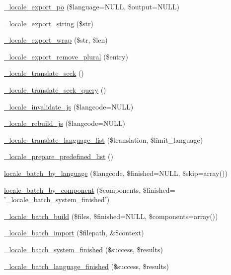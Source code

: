 \begin{DoxyCompactItemize}
\item 
\hyperlink{group__locale_gac152719d6aeadee6074247100424e145}{\_\-locale\_\-export\_\-po} (\$language=NULL, \$output=NULL)
\item 
\hyperlink{group__locale_ga8203c2c5a4f964da2395889920934fae}{\_\-locale\_\-export\_\-string} (\$str)
\item 
\hyperlink{group__locale_gaae41274b64222185a36a42dbc0ff4b94}{\_\-locale\_\-export\_\-wrap} (\$str, \$len)
\item 
\hyperlink{group__locale_gaa18a14faeb8268aee1530afb6b03cca1}{\_\-locale\_\-export\_\-remove\_\-plural} (\$entry)
\item 
\hyperlink{group__locale_ga006049082d29be75fd8ad396beda5883}{\_\-locale\_\-translate\_\-seek} ()
\item 
\hyperlink{group__locale_ga3afc18d03a7b2355e9328bc211acc4d1}{\_\-locale\_\-translate\_\-seek\_\-query} ()
\item 
\hyperlink{group__locale_gae1eec455fe9fcd01af98bb37ff4096ae}{\_\-locale\_\-invalidate\_\-js} (\$langcode=NULL)
\item 
\hyperlink{group__locale_ga1235873f9a64b606895cd77628bffabc}{\_\-locale\_\-rebuild\_\-js} (\$langcode=NULL)
\item 
\hyperlink{group__locale_gacf9e97475d1e1ffaaf336e3a943163a2}{\_\-locale\_\-translate\_\-language\_\-list} (\$translation, \$limit\_\-language)
\item 
\hyperlink{group__locale_gadf3279a1c940efe6955edc1899a97aad}{\_\-locale\_\-prepare\_\-predefined\_\-list} ()
\item 
\hyperlink{group__locale_ga2c34cb914394a45fb4e94561bfc26b71}{locale\_\-batch\_\-by\_\-language} (\$langcode, \$finished=NULL, \$skip=array())
\item 
\hyperlink{group__locale_gaa6ec98b4c2d6b82b6f206bafcf7d2ce6}{locale\_\-batch\_\-by\_\-component} (\$components, \$finished= '\_\-locale\_\-batch\_\-system\_\-finished')
\item 
\hyperlink{group__locale_ga4f10893e8ed214fe4739b9415a06948a}{\_\-locale\_\-batch\_\-build} (\$files, \$finished=NULL, \$components=array())
\item 
\hyperlink{group__locale_ga97c8b79262e3aa8af4e5ea3b7908b99b}{\_\-locale\_\-batch\_\-import} (\$filepath, \&\$context)
\item 
\hyperlink{group__locale_ga3b7cc14a5735d2aee066dd4f6bb517b8}{\_\-locale\_\-batch\_\-system\_\-finished} (\$success, \$results)
\item 
\hyperlink{group__locale_ga06bd6310727083246869907515bea547}{\_\-locale\_\-batch\_\-language\_\-finished} (\$success, \$results)

\end{DoxyCompactItemize}
